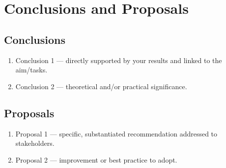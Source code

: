 \chapter{Conclusions and Proposals}

\section*{Conclusions}
\begin{enumerate}
  \item Conclusion 1 — directly supported by your results and linked to the aim/tasks.
  \item Conclusion 2 — theoretical and/or practical significance.
\end{enumerate}

\section*{Proposals}
\begin{enumerate}
  \item Proposal 1 — specific, substantiated recommendation addressed to stakeholders.
  \item Proposal 2 — improvement or best practice to adopt.
\end{enumerate}

